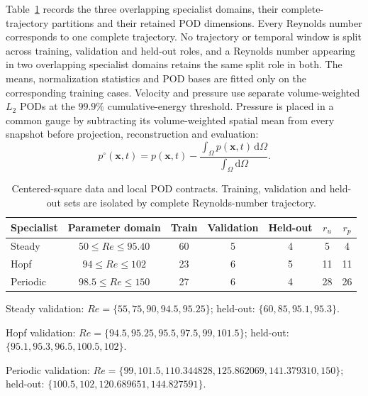 Table~\ref{tab:centered_square_data_contracts} records the three overlapping
specialist domains, their complete-trajectory partitions and their retained
POD dimensions.  Every Reynolds number corresponds to one complete
trajectory.  No trajectory or temporal window is split across training,
validation and held-out roles, and a Reynolds number appearing in two
overlapping specialist domains retains the same split role in both.  The
means, normalization statistics and POD bases are fitted only on the
corresponding training cases.  Velocity and pressure use separate
volume-weighted $L_2$ PODs at the $99.9\%$ cumulative-energy threshold.
Pressure is placed in a common gauge by subtracting its volume-weighted
spatial mean from every snapshot before projection, reconstruction and
evaluation:
\begin{equation}
  p^\circ(\boldsymbol{x},t)
  =
  p(\boldsymbol{x},t)
  -
  \frac{\int_\Omega p(\boldsymbol{x},t)\,\mathrm{d}\Omega}
       {\int_\Omega \mathrm{d}\Omega}.
  \label{eq:centered_square_pressure_gauge}
\end{equation}

\begin{table}[!htbp]
  \centering
  \caption{Centered-square data and local POD contracts.  Training,
  validation and held-out sets are isolated by complete Reynolds-number
  trajectory.}
  \label{tab:centered_square_data_contracts}
  \begin{threeparttable}
  \begin{tabular}{lcccccc}
    \toprule
    Specialist & Parameter domain & Train & Validation & Held-out
    & $r_u$ & $r_p$ \\
    \midrule
    Steady   & $50\le Re\le95.40$  & 60 & 5 & 4 & 5  & 4  \\
    Hopf     & $94\le Re\le102$    & 23 & 6 & 5 & 11 & 11 \\
    Periodic & $98.5\le Re\le150$  & 27 & 6 & 4 & 28 & 26 \\
    \bottomrule
  \end{tabular}
  \begin{tablenotes}\footnotesize
    \item Steady validation:
    $Re=\{55,75,90,94.5,95.25\}$; held-out:
    $\{60,85,95.1,95.3\}$.
    \item Hopf validation:
    $Re=\{94.5,95.25,95.5,97.5,99,101.5\}$; held-out:
    $\{95.1,95.3,96.5,100.5,102\}$.
    \item Periodic validation:
    $Re=\{99,101.5,110.344828,125.862069,141.379310,150\}$;
    held-out:
    $\{100.5,102,120.689651,144.827591\}$.
  \end{tablenotes}
  \end{threeparttable}
\end{table}

